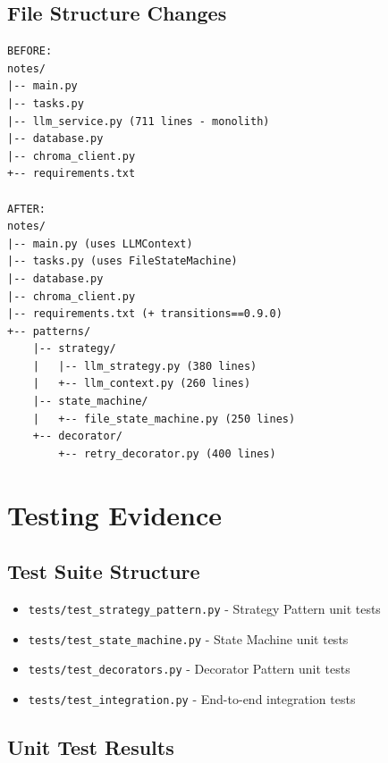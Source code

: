 \documentclass[11pt,a4paper]{article}
\begin{document}
\subsection{File Structure Changes}

\begin{verbatim}
BEFORE:
notes/
|-- main.py
|-- tasks.py
|-- llm_service.py (711 lines - monolith)
|-- database.py
|-- chroma_client.py
+-- requirements.txt

AFTER:
notes/
|-- main.py (uses LLMContext)
|-- tasks.py (uses FileStateMachine)
|-- database.py
|-- chroma_client.py
|-- requirements.txt (+ transitions==0.9.0)
+-- patterns/
    |-- strategy/
    |   |-- llm_strategy.py (380 lines)
    |   +-- llm_context.py (260 lines)
    |-- state_machine/
    |   +-- file_state_machine.py (250 lines)
    +-- decorator/
        +-- retry_decorator.py (400 lines)
\end{verbatim}

\newpage

\section{Testing Evidence}

\subsection{Test Suite Structure}

\begin{itemize}
    \item \texttt{tests/test\_strategy\_pattern.py} - Strategy Pattern unit tests
    \item \texttt{tests/test\_state\_machine.py} - State Machine unit tests
    \item \texttt{tests/test\_decorators.py} - Decorator Pattern unit tests
    \item \texttt{tests/test\_integration.py} - End-to-end integration tests
\end{itemize}

\subsection{Unit Test Results}
\end{document}
